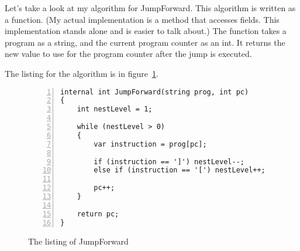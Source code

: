 \documentclass[10pt]{article}
\begin{document}
Let's take a look at my algorithm for JumpForward. This algorithm
is written as a function. (My actual implementation is a method
that accesses fields. This implementation stands alone and is easier
to talk about.) The function takes a program as a string, and
the current program counter as an int. It returns the new value to use
for the program counter after the jump is executed.

The listing for the algorithm is in figure~\ref{fig:jumpforward}.

\begin{figure}
\caption{The listing of JumpForward}
\label{fig:jumpforward}
\begin{lstlisting}[numbers=left]
internal int JumpForward(string prog, int pc)
{
    int nestLevel = 1;

    while (nestLevel > 0)
    {
        var instruction = prog[pc];
        
        if (instruction == ']') nestLevel--;
        else if (instruction == '[') nestLevel++;
        
        pc++;
    }
	
    return pc;
}
\end{lstlisting}
\end{figure}
\end{document}
